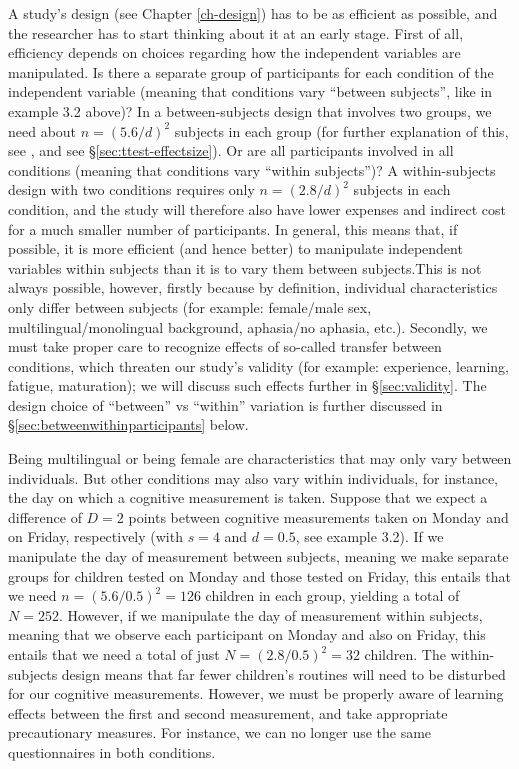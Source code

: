 \documentclass[
]{book}
\begin{document}
A study's design (see Chapter \ref{ch-design}) has to be as efficient as possible, and the researcher has to start thinking about it at an early stage. First of all, efficiency depends on choices regarding how the independent variables are manipulated. Is there a separate group of participants for each condition of the independent variable (meaning that conditions vary ``between subjects'', like in example 3.2 above)? In a between-subjects design that involves two groups, we need about \(n = (5.6/d)^2\) subjects in each group (for further explanation of this, see \citet{Gelm07}, and see §\ref{sec:ttest-effectsize}). Or are all participants involved in all conditions (meaning that conditions vary ``within subjects'')? A within-subjects design with two conditions requires only \(n = (2.8/d)^2\) subjects in each condition, and the study will therefore also have lower expenses and indirect cost for a much smaller number of participants. In general, this means that, if possible, it is more efficient (and hence better) to manipulate independent variables within subjects than it is to vary them between subjects.This is not always possible, however, firstly because by definition, individual characteristics only differ between subjects (for example: female/male sex, multilingual/monolingual background, aphasia/no aphasia, etc.). Secondly, we must take proper care to recognize effects of so-called transfer between conditions, which threaten our study's validity (for example: experience, learning, fatigue, maturation); we will discuss such effects further in §\ref{sec:validity}.
The design choice of ``between'' vs ``within'' variation is further discussed in §\ref{sec:betweenwithinparticipants} below.

Being multilingual or being female are characteristics that may only vary between individuals. But other conditions may also vary within individuals, for instance, the day on which a cognitive measurement is taken. Suppose that we expect a difference of \(D = 2\) points between cognitive measurements taken on Monday and on Friday, respectively (with \(s = 4\) and \(d = 0.5\), see example 3.2). If we manipulate the day of measurement between subjects, meaning we make separate groups for children tested on Monday and those tested on Friday, this entails that we need \(n = (5.6/0.5)^2 = 126\) children in each group, yielding a total of \(N = 252\). However, if we manipulate the day of measurement within subjects, meaning that we observe each participant on Monday and also on Friday, this entails that we need a total of just \(N = (2.8/0.5)^2 = 32\) children. The within-subjects design means that far fewer children's routines will need to be disturbed for our cognitive measurements. However, we must be properly aware of learning effects between the first and second measurement, and take appropriate precautionary measures. For instance, we can no longer use the same questionnaires in both conditions.
\end{document}
